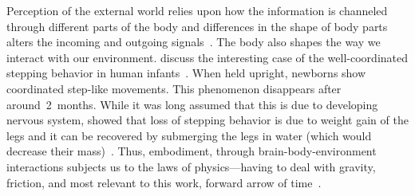 Perception of the external world relies upon how the information is channeled through different parts of the body and differences in the shape of body parts alters the incoming and outgoing signals~\cite{Gomez2019Neuron}.
The body also shapes the way we interact with our environment.
 discuss the interesting case of the well-coordinated stepping behavior in human infants~\cite{Gomez2019Neuron}.
When held upright, newborns show coordinated step-like movements.
This phenomenon disappears after around~2~months.
While it was long assumed that this is due to developing nervous system, \citeauthor{Thelen1984InfBeh} showed that loss of stepping behavior is due to weight gain of the legs and it can be recovered by submerging the legs in water (which would decrease their mass)~\cite{Thelen1984InfBeh}.
Thus, embodiment, through brain-body-environment interactions subjects us to the laws of physics---having to deal with gravity, friction, and most relevant to this work, forward arrow of time~\cite{Pfeifer2006Book}.


